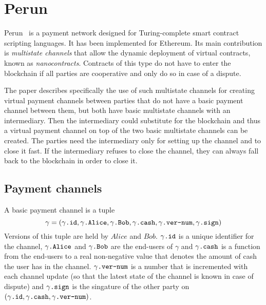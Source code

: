 \section{Perun}
  Perun~\cite{perun} is a payment network designed for Turing-complete smart contract
  scripting languages. It has been implemented for Ethereum. Its main contribution is
  \textit{multistate channels} that allow the dynamic deployment of virtual contracts,
  known as \textit{nanocontracts}. Contracts of this type do not have to enter the
  blockchain if all parties are cooperative and only do so in case of a dispute.

  The paper describes specifically the use of such multistate channels for creating
  virtual payment channels between parties that do not have a basic payment channel
  between them, but both have basic multistate channels with an intermediary. Then the
  intermediary could substitute for the blockchain and thus a virtual payment channel on
  top of the two basic multistate channels can be created. The parties need the
  intermediary only for setting up the channel and to close it fast. If the intermediary
  refuses to close the channel, they can always fall back to the blockchain in order to
  close it.

  \subsection{Payment channels}
    A basic payment channel is a tuple
    \begin{equation*}
      \gamma = \left(\gamma\mbox{\texttt{.id}}, \gamma\mbox{\texttt{.Alice}},
      \gamma\mbox{\texttt{.Bob}}, \gamma\mbox{\texttt{.cash}},
      \gamma\mbox{\texttt{.ver-num}}, \gamma\mbox{\texttt{.sign}}\right)
    \end{equation*}
    Versions of this tuple are held by $Alice$ and $Bob$. $\gamma\mbox{\texttt{.id}}$ is a
    unique identifier for the channel, $\gamma\mbox{\texttt{.Alice}}$ and
    $\gamma\mbox{\texttt{.Bob}}$ are the end-users of $\gamma$ and
    $\gamma\mbox{\texttt{.cash}}$ is a function from the end-users to a real non-negative
    value that denotes the amount of cash the user has in the channel.
    $\gamma\mbox{\texttt{.ver-num}}$ is a number that is incremented with each channel
    update (so that the latest state of the channel is known in case of dispute) and
    $\gamma\mbox{\texttt{.sign}}$ is the singature of the other party on
    $\left(\gamma\mbox{\texttt{.id}}, \gamma\mbox{\texttt{.cash}},
    \gamma\mbox{\texttt{.ver-num}}\right)$.

